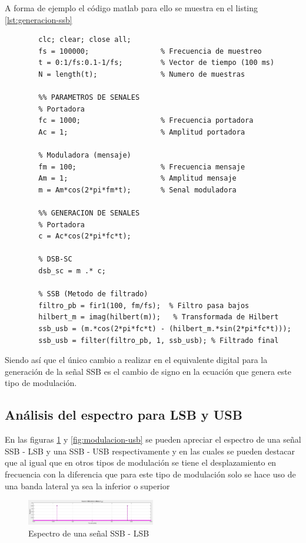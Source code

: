 \documentclass[conference]{IEEEtran}
\begin{document}
	A forma de ejemplo el código matlab para ello se muestra en el listing \ref{lst:generacion-ssb}
	\begin{lstlisting}[caption="asdf", label="lst:generacion-ssb"]
		%% CONFIGURACION INICIAL
		clc; clear; close all;
		fs = 100000;                 % Frecuencia de muestreo
		t = 0:1/fs:0.1-1/fs;         % Vector de tiempo (100 ms)
		N = length(t);               % Numero de muestras
		
		%% PARAMETROS DE SENALES
		% Portadora
		fc = 1000;                   % Frecuencia portadora
		Ac = 1;                      % Amplitud portadora
		
		% Moduladora (mensaje)
		fm = 100;                    % Frecuencia mensaje
		Am = 1;                      % Amplitud mensaje
		m = Am*cos(2*pi*fm*t);       % Senal moduladora
		
		%% GENERACION DE SENALES
		% Portadora
		c = Ac*cos(2*pi*fc*t);
		
		% DSB-SC
		dsb_sc = m .* c;
		
		% SSB (Metodo de filtrado)
		filtro_pb = fir1(100, fm/fs);  % Filtro pasa bajos
		hilbert_m = imag(hilbert(m));   % Transformada de Hilbert
		ssb_usb = (m.*cos(2*pi*fc*t) - (hilbert_m.*sin(2*pi*fc*t)));
		ssb_usb = filter(filtro_pb, 1, ssb_usb); % Filtrado final
	\end{lstlisting}
	
	Siendo así que el único cambio a realizar en el equivalente digital para la generación de la señal SSB es el cambio de signo en la ecuación que genera este tipo de modulación.
	
	\subsection{\textbf{Análisis del espectro para LSB y USB}}
	
	En las figuras \ref{fig:modulacion-lsb} y \ref{fig:modulacion-usb} se pueden apreciar el espectro de una señal SSB - LSB y una SSB - USB respectivamente y en las cuales se pueden destacar que al igual que en otros tipos de modulación se tiene el desplazamiento en frecuencia con la diferencia que para este tipo de modulación solo se hace uso de una banda lateral ya sea la inferior o superior
	
	\begin{figure}[h]
		\centering
		\includegraphics[width=0.5\textwidth]{media/modulacion-lsb}
		\caption{Espectro de una señal SSB - LSB}
		\label{fig:modulacion-lsb}
	\end{figure}
	
\end{document}
